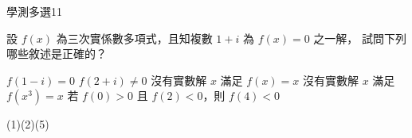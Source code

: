 \begin{QUESTIONS}
\begin{QUESTION}
        \begin{ExamInfo}{93}{學測}{多選}{11}
        \end{ExamInfo}
        \begin{ExamAnsRateInfo}{29}{55}{23}{9}
        \end{ExamAnsRateInfo}
        \begin{QBODY}
            設 $f(x)$ 為三次實係數多項式，且知複數 $1+i$ 為 $f(x)=0$ 之一解，
            試問下列哪些敘述是正確的？
            \begin{QOPS} 
                \QOP $f(1-i)=0$ \quad 
                \QOP $f(2+i) \neq 0$ 
                \QOP 沒有實數解 $x$ 滿足 $f(x)=x$ 
                \QOP 沒有實數解 $x$ 滿足 $f(x^3)=x$ 
                \QOP 若 $f(0)>0$ 且 $f(2) <0$，則 $f(4)<0$ 
            \end{QOPS}
        \end{QBODY}
        \begin{QFROMS}
        \end{QFROMS}
        \begin{QTAGS}\end{QTAGS}
        \begin{QANS}
            (1)(2)(5)
        \end{QANS}
        \begin{QSOLLIST}
        \end{QSOLLIST}
        \begin{QEMPTYSPACE}
        \end{QEMPTYSPACE}
    \end{QUESTION}
\end{QUESTIONS}
